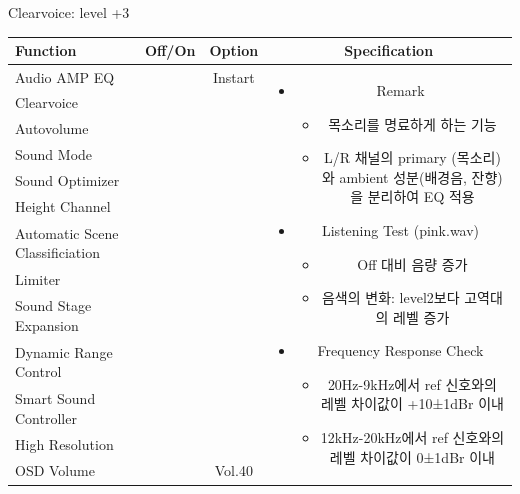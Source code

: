 \documentclass{beamer}
\begin{document}
\begin{frame}[t]{Clearvoice: level +3}
\begin{tiny}
\begin{tabular}{@{}lccc@{}}
\toprule
Function & Off/On & Option & Specification \\
\midrule
Audio AMP EQ & \color{black}{Off} & Instart &
\multirow{13}{60mm}{
\begin{itemize}
\item Remark
	\begin{itemize}
	\item 목소리를 명료하게 하는 기능
	\item L/R 채널의 primary (목소리)와 ambient 성분(배경음, 잔향)을 분리하여 EQ 적용
	\end{itemize}
\item Listening Test (pink.wav)
	\begin{itemize}
	\item Off 대비 음량 증가
	\item 음색의 변화: level2보다 고역대의 레벨 증가
	\end{itemize}
\item Frequency Response Check
  \begin{itemize}
  \item 20Hz-9kHz에서 ref 신호와의 레벨 차이값이 +10±1dBr 이내
  \item 12kHz-20kHz에서 ref 신호와의 레벨 차이값이 0±1dBr 이내
  \end{itemize}
\end{itemize}
} \\
Clearvoice & \color{blue}{On} & \color{blue}{+3} & \\
Autovolume & \color{black}{Off} & & \\
Sound Mode & \color{black}{Off} & & \\
Sound Optimizer & \color{black}{Off} & & \\
Height Channel & \color{black}{Off} & & \\
Automatic Scene Classificiation & \color{black}{Off} & & \\
Limiter & \color{black}{Off} & & \\
Sound Stage Expansion & \color{black}{Off} & & \\
Dynamic Range Control & \color{black}{Off} & & \\
Smart Sound Controller & \color{black}{Off} & & \\
High Resolution & \color{black}{Off} & & \\
OSD Volume & \color{blue}{On} & Vol.40 & \\
\midrule
\end{tabular}
\end{tiny}


\end{frame}
\end{document}
